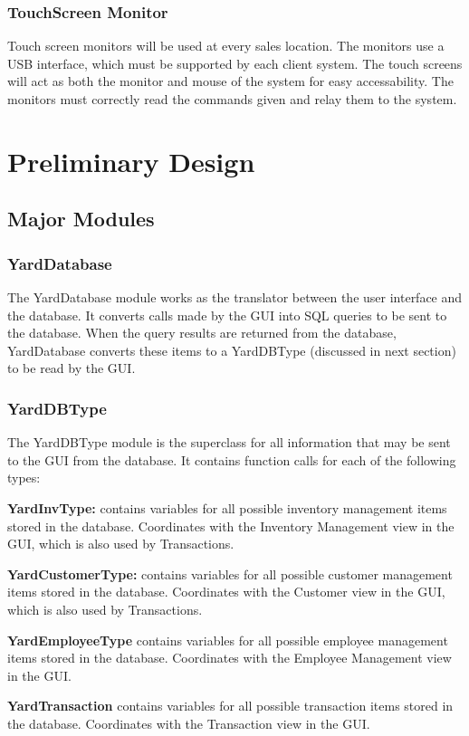 \documentclass{report}
\begin{document}
    \subsubsection{TouchScreen Monitor}
    Touch screen monitors will be used at every sales location.
    The monitors use a USB interface, which must be supported by
    each client system.  The touch screens will act as both the
    monitor and mouse of the system for easy accessability.  The
    monitors must correctly read the commands given and relay them
    to the system.

\section{Preliminary Design}

    \subsection{Major Modules}

        \subsubsection{YardDatabase}
        The YardDatabase module works as the translator between
        the user interface and the database.  It converts calls
        made by the GUI into SQL queries to be sent to the
        database.  When the query results are returned from the
        database, YardDatabase converts these items to a
        YardDBType (discussed in next section) to be read by the
        GUI.
        \subsubsection{YardDBType}
        The YardDBType module is the superclass for all information that
        may be sent to the GUI from the database.  It contains
        function calls for each of the following types:
        \begin{list}{}
            \item{{\bf YardInvType:} contains variables for all
            possible inventory management items stored in the
            database.  Coordinates with the Inventory Management
            view in the GUI, which is also used by Transactions.}
            \item{{\bf YardCustomerType:} contains variables for
            all possible customer management items stored in the database.
            Coordinates with the Customer view in the GUI,
            which is also used by Transactions.}
            \item{{\bf YardEmployeeType} contains variables for
            all possible employee management items stored in the
            database.  Coordinates with the Employee Management
            view in the GUI.}
            \item{{\bf YardTransaction} contains variables for all
            possible transaction items stored in the database.
            Coordinates with the Transaction view in the GUI.}
        \end{list}{}
\end{document}

